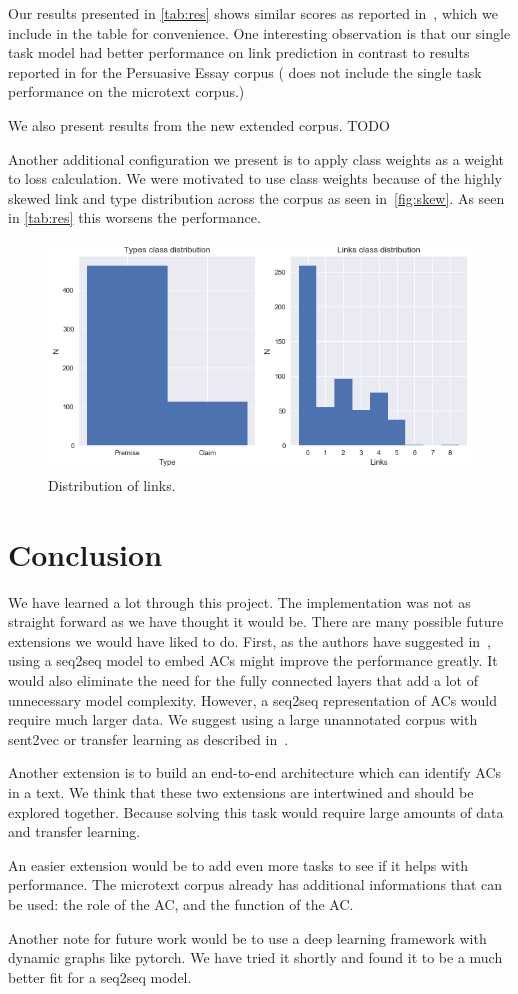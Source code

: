 \documentclass[onecolumn]{article}
\begin{document}
Our results presented in \autoref{tab:res} shows similar scores as reported in~\cite{potash2017here}, which we include in the table for convenience.
One interesting observation is that our single task model had better performance on link prediction in contrast to results reported in \cite{potash2017here} for the Persuasive Essay corpus
(\cite{potash2017here} does not include the single task performance on the microtext corpus.)

We also present results from the new extended corpus.
TODO

Another additional configuration we present is to apply class weights as a weight to loss calculation.
We were motivated to use class weights because of the highly skewed link and type distribution across the corpus as seen in~\autoref{fig:skew}.
As seen in \autoref{tab:res} this worsens the performance.

\begin{figure}[h]
    \centering
    \includegraphics[width=0.4\linewidth]{fig/dist.png}
    \caption{Distribution of links.}\label{fig:skew}
\end{figure}

\section{Conclusion}
We have learned a lot through this project.
The implementation was not as straight forward as we have thought it would be.
There are many possible future extensions we would have liked to do.
First, as the authors have suggested in~\cite{potash2017here}, using a seq2seq model to embed ACs might improve the performance greatly.
It would also eliminate the need for the fully connected layers that add a lot of unnecessary model complexity.
However, a seq2seq representation of ACs would require much larger data.
We suggest using a large unannotated corpus with sent2vec or transfer learning as described in~\cite{sent}.

Another extension is to build an end-to-end architecture which can identify ACs in a text.
We think that these two extensions are intertwined and should be explored together.
Because solving this task would require large amounts of data and transfer learning.

An easier extension would be to add even more tasks to see if it helps with performance.
The microtext corpus already has additional informations that can be used: the role of the AC, and the function of the AC.

Another note for future work would be to use a deep learning framework with dynamic graphs like pytorch.
We have tried it shortly and found it to be a much better fit for a seq2seq model.

\nocite{*}


\end{document}
